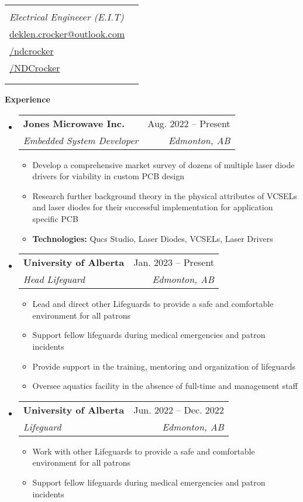 \documentclass[letterpaper,12pt]{article}[leftmargin=*]
\makeatletter
\def \fullname {Nicolas Deklen Crocker}
\def \subtitle {Electrical Engineeer (E.I.T)}
\def \linkedinicon {\faLinkedin}
\def \linkedinlink {https://linkedin.com/in/ndcrocker/}
\def \linkedintext {/ndcrocker}
\def \phoneicon {\faPhone}
\def \phonetext {+1 (825) 333-4907}
\def \emailicon {\faEnvelope}
\def \emaillink {mailto:deklen.crocker@outlook.com}
\def \emailtext {deklen.crocker@outlook.com}
\def \githubicon {\faGithub}
\def \githublink {https://https://github.com/NDCrocker}
\def \githubtext {/NDCrocker}
\def \headertype {\singlecol} %
\def \entryspacing {-0pt}
\def \linkedin {\linkedinicon \hspace{3pt}\href{\linkedinlink}{\linkedintext}}
\def \phone {\phoneicon \hspace{3pt}{ \phonetext}}
\def \email {\emailicon \hspace{3pt}\href{\emaillink}{\emailtext}}
\def \github {\githubicon \hspace{3pt}\href{\githublink}{\githubtext}}
\renewcommand{\section}[2]{\vspace{5pt}
  \colorbox{secondary}{\color{white}\raggedbottom\normalsize\textbf{{#1}{\hspace{7pt}#2}}}
}
\newcommand{\resumeEntryStart}{\begin{itemize}[leftmargin=2.5mm]}
\newcommand{\resumeEntryEnd}{\end{itemize}\vspace{\entryspacing}}
\newcommand{\resumeItemListStart}{\begin{itemize}[leftmargin=4.5mm]}
\newcommand{\resumeItemListEnd}{\end{itemize}}
\newcommand{\resumeItem}[1]{
  \item\small{
    {#1 \vspace{-2pt}}
  }
}
\newcommand{\resumeEntryTSDL}[4]{
  \vspace{-1pt}\item[]
    \begin{tabularx}{0.97\textwidth}{X@{\hspace{60pt}}r}
      \textbf{\color{primary}#1} & {\firabook\color{accent}\small#2} \\
      \textit{\color{accent}\small#3} & \textit{\color{accent}\small#4} \\
    \end{tabularx}\vspace{-6pt}
}
\newcommand{\doublecol}[6]{
  \begin{tabularx}{\textwidth}{Xr}
    {
      \begin{tabular}[c]{l}
        \fontsize{35}{45}\selectfont{\color{primary}{{\textbf{\fullname}}}} \\
        {\textit{\subtitle}} %
      \end{tabular}
    } & {
      \begin{tabular}[c]{l@{\hspace{1.5em}}l}
        {\small#4} & {\small#1} \\
        {\small#5} & {\small#2} \\
        {\small#6} & {\small#3}
      \end{tabular}
    }
  \end{tabularx}
}
\newcommand{\singlecol}[6]{
  \begin{tabularx}{\textwidth}{Xr}
    {
      \begin{tabular}[b]{l}
        \fontsize{35}{45}\selectfont{\color{primary}{{\textbf{\fullname}}}} \\
        {\textit{\subtitle}} %
      \end{tabular}
    } & {
      \begin{tabular}[c]{l}
        {\small#1} \\
        {\small#2} \\
        {\small#3} \\
        {\small#4} \\
        {\small#5} \\
        {\small#6}
      \end{tabular}
    }
  \end{tabularx}
}
\makeatother
\begin{document}


\headertype{\phone}{\email}{\linkedin}{\github}{}{} %
\vspace{-25pt} %

\section{\faPieChart}{Experience}

  \resumeEntryStart
    \resumeEntryTSDL
      {Jones Microwave Inc.}{Aug. 2022 -- Present}
      {Embedded System Developer}{Edmonton, AB}
    \resumeItemListStart
      \resumeItem {Develop a comprehensive market survey of dozens of multiple laser diode drivers for viability in custom PCB design}
      \resumeItem {Research further background theory in the physical attributes of VCSELs and laser diodes for their successful
      implementation for application specific PCB}
      \resumeItem {\textbf{Technologies:} Qucs Studio, Laser Diodes, VCSELs, Laser Drivers}
    \resumeItemListEnd
  \resumeEntryEnd

  \resumeEntryStart
    \resumeEntryTSDL
      {University of Alberta}{Jan. 2023 -- Present}
      {Head Lifeguard}{Edmonton, AB}
    \resumeItemListStart
      \resumeItem {Lead and direct other Lifeguards to provide a safe and comfortable environment for all patrons}
      \resumeItem {Support fellow lifeguards during medical emergencies and patron incidents}
      \resumeItem {Provide support in the training, mentoring and organization of lifeguards}
      \resumeItem{Oversee aquatics facility in the absence of full-time and management staff}
    \resumeItemListEnd
  \resumeEntryEnd

  \resumeEntryStart
    \resumeEntryTSDL
    {University of Alberta}{Jun. 2022 -- Dec. 2022}
    {Lifeguard}{Edmonton, AB}
    \resumeItemListStart
        \resumeItem {Work with other Lifeguards to provide a safe and comfortable environment for all patrons}
        \resumeItem {Support fellow lifeguards during medical emergencies and patron incidents}
    \resumeItemListEnd
  \resumeEntryEnd
\end{document}
